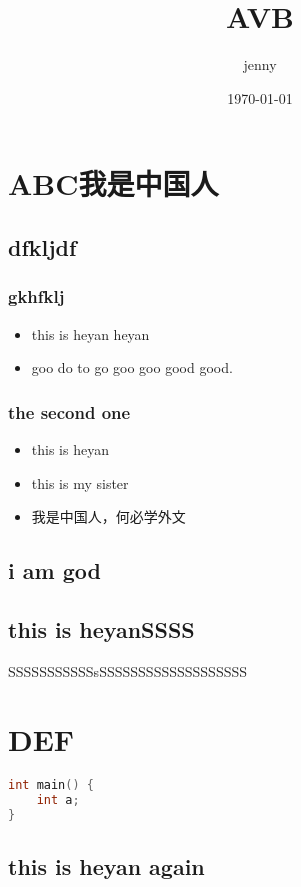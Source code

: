 \documentclass[10pt,b5paper]{article}
\author{jenny}
\date{\today}
\title{AVB}
\begin{document}
\maketitle
\tableofcontents



\section{ABC我是中国人}
\label{sec-1}
\subsection{dfkljdf}
\label{sec-1-1}
\subsubsection{gkhfklj}
\label{sec-1-1-1}
\begin{itemize}
\item this is heyan heyan
\item goo do to go goo goo good good.
\end{itemize}

\subsubsection{the second one}
\label{sec-1-1-2}
\begin{itemize}
\item this is heyan
\item this is my sister
\item 我是中国人，何必学外文
\end{itemize}

\subsection{i am god}
\label{sec-1-2}
\subsection{this is heyanSSSS}
\label{sec-1-3}
SSSSSSSSSSSsSSSSSSSSSSSSSSSSSSS

\section{DEF}
\label{sec-2}
\begin{lstlisting}[language=c++]
int main() {
    int a;
}
\end{lstlisting}
\subsection{this is heyan again}
\label{sec-2-1}
\end{document}
